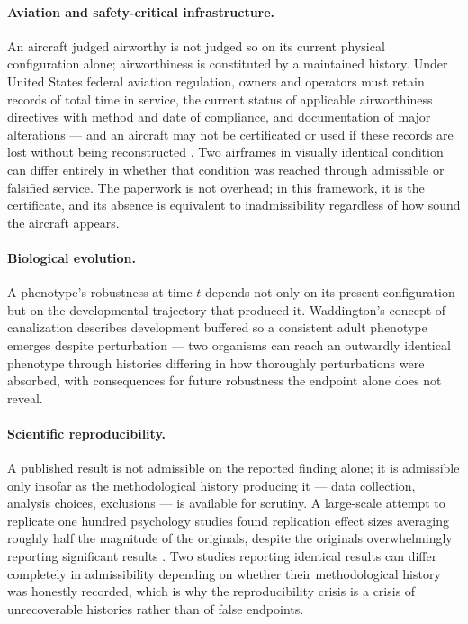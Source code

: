 \documentclass[11pt]{article}
\begin{document}
\paragraph{Aviation and safety-critical infrastructure.} An aircraft judged airworthy is not judged so on its current physical configuration alone; airworthiness is constituted by a maintained history. Under United States federal aviation regulation, owners and operators must retain records of total time in service, the current status of applicable airworthiness directives with method and date of compliance, and documentation of major alterations --- and an aircraft may not be certificated or used if these records are lost without being reconstructed \cite{faa91417}. Two airframes in visually identical condition can differ entirely in whether that condition was reached through admissible or falsified service. The paperwork is not overhead; in this framework, it is the certificate, and its absence is equivalent to inadmissibility regardless of how sound the aircraft appears.

\paragraph{Biological evolution.} A phenotype's robustness at time $t$ depends not only on its present configuration but on the developmental trajectory that produced it. Waddington's concept of canalization describes development buffered so a consistent adult phenotype emerges despite perturbation \cite{waddington1942} --- two organisms can reach an outwardly identical phenotype through histories differing in how thoroughly perturbations were absorbed, with consequences for future robustness the endpoint alone does not reveal.

\paragraph{Scientific reproducibility.} A published result is not admissible on the reported finding alone; it is admissible only insofar as the methodological history producing it --- data collection, analysis choices, exclusions --- is available for scrutiny. A large-scale attempt to replicate one hundred psychology studies found replication effect sizes averaging roughly half the magnitude of the originals, despite the originals overwhelmingly reporting significant results \cite{osc2015}. Two studies reporting identical results can differ completely in admissibility depending on whether their methodological history was honestly recorded, which is why the reproducibility crisis is a crisis of unrecoverable histories rather than of false endpoints.
\end{document}
